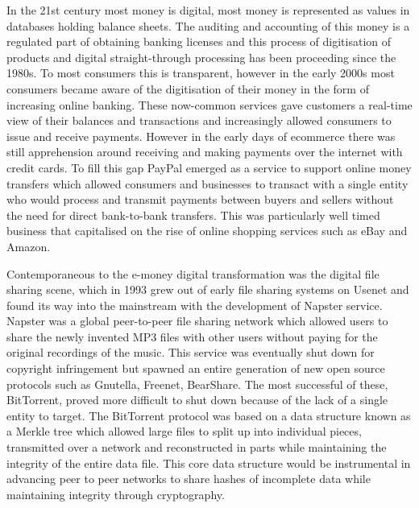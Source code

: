 
In the 21st century most money is digital, most money is represented as values
in databases holding balance sheets. The auditing and accounting of this money
is a regulated part of obtaining banking licenses and this process of
digitisation of products and digital straight-through processing has been
proceeding since the 1980s. To most consumers this is transparent, however in
the early 2000s most consumers became aware of the digitisation of their money
in the form of increasing online banking. These now-common services gave
customers a real-time view of their balances and transactions and increasingly
allowed consumers to issue and receive payments. However in the early days of
ecommerce there was still apprehension around receiving and making payments over
the internet with credit cards. To fill this gap PayPal emerged as a service to
support online money transfers which allowed consumers and businesses to
transact with a single entity who would process and transmit payments between
buyers and sellers without the need for direct bank-to-bank transfers. This was
particularly well timed business that capitalised on the rise of online shopping
services such as eBay and Amazon.


Contemporaneous to the e-money digital transformation was the digital file
sharing scene, which in 1993 grew out of early file sharing systems on Usenet
and found its way into the mainstream with the development of Napster service.
Napster was a global peer-to-peer file sharing network which allowed users to
share the newly invented MP3 files with other users without paying for the
original recordings of the music. This service was eventually shut down for
copyright infringement but spawned an entire generation of new open source
protocols such as Gnutella, Freenet, BearShare. The most successful of these,
BitTorrent, proved more difficult to shut down because of the lack of a single
entity to target.  The BitTorrent protocol was based on a data structure known
as a Merkle tree which allowed large files to split up into individual pieces,
transmitted over a network and reconstructed in parts while maintaining the
integrity of the entire data file. This core data structure would be
instrumental in advancing peer to peer networks to share hashes of incomplete
data while maintaining integrity through cryptography.


